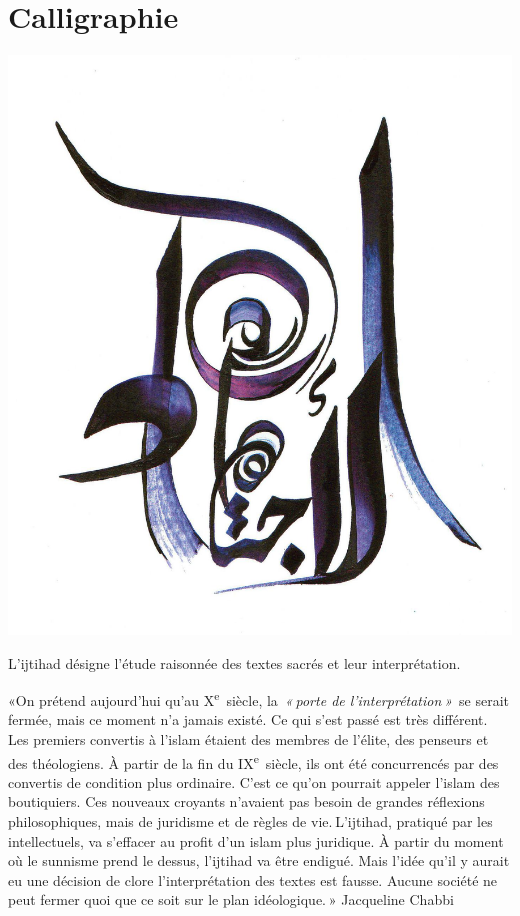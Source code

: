 \section{Calligraphie}

\includegraphics[width=\textwidth]{Images/image009.png}
\begin{Def}[iǧtihād]
L'ijtihad désigne l'étude raisonnée des textes sacrés et leur
interprétation.
\end{Def}
\begin{cite}
«On prétend aujourd'hui qu'au
X\textsuperscript{e}~siècle, la~\emph{« porte de l'interprétation »}~se
serait fermée, mais ce moment n'a jamais existé. Ce qui s'est passé est
très différent. Les premiers convertis à l'islam étaient des membres de
l'élite, des penseurs et des théologiens. À partir de la fin du
IX\textsuperscript{e}~siècle, ils ont été concurrencés par des convertis
de condition plus ordinaire. C'est ce qu'on pourrait appeler l'islam des
boutiquiers. Ces nouveaux croyants n'avaient pas besoin de grandes
réflexions philosophiques, mais de juridisme et de règles de
vie. L'ijtihad, pratiqué par les intellectuels, va s'effacer au profit
d'un islam plus juridique. À partir du moment où le sunnisme prend le
dessus, l'ijtihad va être endigué. Mais l'idée qu'il y aurait eu une
décision de clore l'interprétation des textes est fausse. Aucune société
ne peut fermer quoi que ce soit sur le plan idéologique. » Jacqueline Chabbi
\end{cite}


